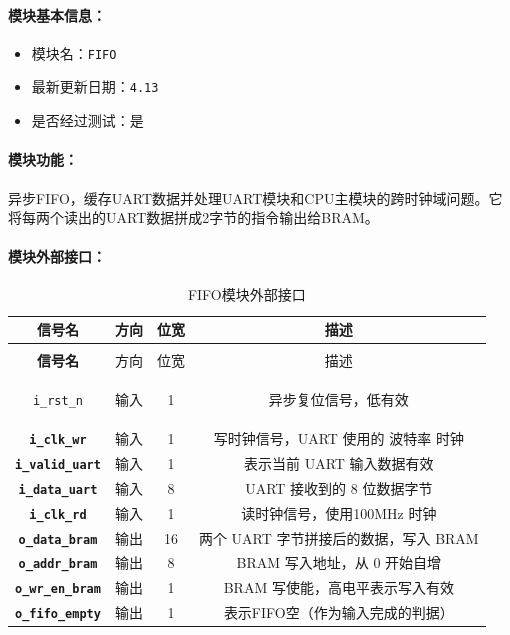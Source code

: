 \documentclass[lang=cn,a4paper,newtx]{elegantpaper}
\begin{document}
\paragraph{模块基本信息：}
\begin{itemize}
  \item 模块名：\texttt{FIFO}
  \item 最新更新日期：\texttt{4.13}
  \item 是否经过测试：是
\end{itemize}
\paragraph{模块功能：}
异步FIFO，缓存UART数据并处理UART模块和CPU主模块的跨时钟域问题。它将每两个读出的UART数据拼成2字节的指令输出给BRAM。
\paragraph{模块外部接口：}
\begin{longtable}{>{\bfseries}c c c c}
  \caption{FIFO模块外部接口} \\
  \toprule
  信号名 & 方向 & 位宽 & 描述 \\
  \midrule
  \endfirsthead

  \multicolumn{4}{l}{\textbf{（续表）FIFO模块外部接口}} \\
  \toprule
  信号名 & 方向 & 位宽 & 描述 \\
  \midrule
  \endhead

  \texttt{i\_rst\_n}         & 输入  & 1        & 异步复位信号，低有效 \\
  \texttt{i\_clk\_wr}        & 输入  & 1        & 写时钟信号，UART 使用的 波特率 时钟 \\
  \texttt{i\_valid\_uart}    & 输入  & 1        & 表示当前 UART 输入数据有效 \\
  \texttt{i\_data\_uart}     & 输入  & 8        & UART 接收到的 8 位数据字节 \\
  \texttt{i\_clk\_rd}        & 输入  & 1        & 读时钟信号，使用100MHz 时钟 \\
  \texttt{o\_data\_bram}     & 输出  & 16       & 两个 UART 字节拼接后的数据，写入 BRAM \\
  \texttt{o\_addr\_bram}     & 输出  & 8        & BRAM 写入地址，从 0 开始自增 \\
  \texttt{o\_wr\_en\_bram}   & 输出  & 1        & BRAM 写使能，高电平表示写入有效 \\
  \texttt{o\_fifo\_empty}    & 输出   & 1       & 表示FIFO空（作为输入完成的判据）\\
  \bottomrule
\end{longtable}
\end{document}
